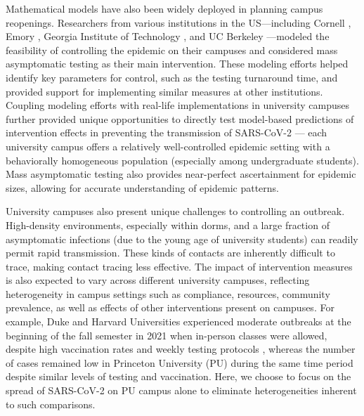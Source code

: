 \documentclass[12pt]{article}
\begin{document}
Mathematical models have also been widely deployed in planning campus reopenings.
Researchers from various institutions in the US---including Cornell \citep{frazier2022modeling}, Emory \citep{lopman2020model}, Georgia Institute of Technology \citep{gibson2021surveillance}, and UC Berkeley \citep{brook2021optimizing}---modeled the feasibility of controlling the epidemic on their campuses and considered mass asymptomatic testing as their main intervention.
These modeling efforts helped identify key parameters for control, such as the testing turnaround time, and provided support for implementing similar measures at other institutions.
Coupling modeling efforts with real-life implementations in university campuses further provided unique opportunities to directly test model-based predictions of intervention effects in preventing the transmission of SARS-CoV-2 \citep{frazier2022modeling}---
each university campus offers a relatively well-controlled epidemic setting with a behaviorally homogeneous population (especially among undergraduate students).
Mass asymptomatic testing also provides near-perfect ascertainment for epidemic sizes, allowing for accurate understanding of epidemic patterns.

University campuses also present unique challenges to controlling an outbreak.
High-density environments, especially within dorms, and a large fraction of asymptomatic infections (due to the young age of university students) can readily permit rapid transmission.
These kinds of contacts are inherently difficult to trace, making contact tracing less effective.
The impact of intervention measures is also expected to vary across different university campuses, reflecting heterogeneity in campus settings such as compliance, resources, community prevalence, as well as effects of other interventions present on campuses.
For example, Duke and Harvard Universities experienced moderate outbreaks at the beginning of the fall semester in 2021 when in-person classes were allowed, despite high vaccination rates and weekly testing protocols \citep{dukeoutbreak,harvardoutbreak}, whereas the number of cases remained low in Princeton University (PU) during the same time period despite similar levels of testing and vaccination.
Here, we choose to focus on the spread of SARS-CoV-2 on PU campus alone to eliminate heterogeneities inherent to such comparisons.
\end{document}
